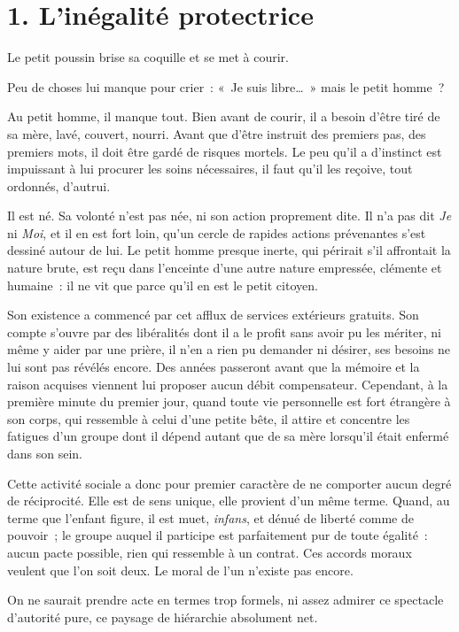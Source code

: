\documentclass[french,twoside]{book} %
\begin{document}
\section[1. L’inégalité protectrice]{1. L’inégalité protectrice}
\noindent Le petit poussin brise sa coquille et se met à courir.\par
Peu de choses lui manque pour crier : « Je suis libre… » mais le petit homme ?\par
Au petit homme, il manque tout. Bien avant de courir, il a besoin d’être tiré de sa mère, lavé, couvert, nourri. Avant que d’être instruit des premiers pas, des premiers mots, il doit être gardé de risques mortels. Le peu qu’il a d’instinct est impuissant à lui procurer les soins nécessaires, il faut qu’il les reçoive, tout ordonnés, d’autrui.\par
Il est né. Sa volonté n’est pas née, ni son action proprement dite. Il n’a pas dit \emph{Je} ni \emph{Moi}, et il en est fort loin, qu’un cercle de rapides actions prévenantes s’est dessiné autour de lui. Le petit homme presque inerte, qui périrait s’il affrontait la nature brute, est reçu dans l’enceinte d’une autre nature empressée, clémente et humaine : il ne vit que parce qu’il en est le petit citoyen.\par
Son existence a commencé par cet afflux de services extérieurs gratuits. Son compte s’ouvre par des libéralités dont il a le profit sans avoir pu les mériter, ni même y aider par une prière, il n’en a rien pu demander ni désirer, ses besoins ne lui sont pas révélés encore. Des années passeront avant que la mémoire et la raison acquises viennent lui proposer aucun débit compensateur. Cependant, à la première minute du premier jour, quand toute vie personnelle est fort étrangère à son corps, qui ressemble à celui d’une petite bête, il attire et concentre les fatigues d’un groupe dont il dépend autant que de sa mère lorsqu’il était enfermé dans son sein.\par
Cette activité sociale a donc pour premier caractère de ne comporter aucun degré de réciprocité. Elle est de sens unique, elle provient d’un même terme. Quand, au terme que l’enfant figure, il est muet, \emph{infans}, et dénué de liberté comme de pouvoir ; le groupe auquel il participe est parfaitement pur de toute égalité : aucun pacte possible, rien qui ressemble à un contrat. Ces accords moraux veulent que l’on soit deux. Le moral de l’un n’existe pas encore.\par
On ne saurait prendre acte en termes trop formels, ni assez admirer ce spectacle d’autorité pure, ce paysage de hiérarchie absolument net.\par
\end{document}
